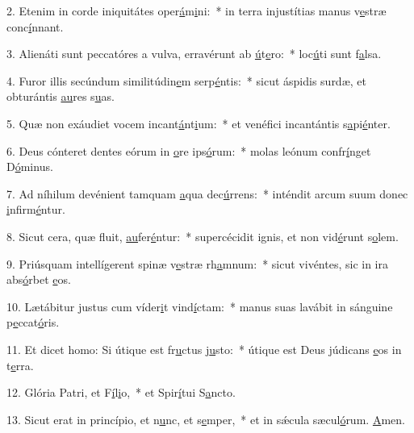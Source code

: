 2. Etenim in corde iniquitátes oper\uline{á}m\uline{i}ni:~* in terra injustítias manus v\uline{e}stræ conc\uline{í}nnant.\par 
3. Alienáti sunt peccatóres a vulva, erravérunt ab \uline{ú}t\uline{e}ro:~* loc\uline{ú}ti sunt f\uline{a}lsa.\par 
4. Furor illis secúndum similitúdin\uline{e}m serp\uline{é}ntis:~* sicut áspidis surdæ, et obturántis \uline{au}res s\uline{u}as.\par 
5. Quæ non exáudiet vocem incant\uline{á}nt\uline{i}um:~* et venéfici incantántis s\uline{a}pi\uline{é}nter.\par 
6. Deus cónteret dentes eórum in \uline{o}re ips\uline{ó}rum:~* molas leónum confr\uline{í}nget D\uline{ó}minus.\par 
7. Ad níhilum devénient tamquam \uline{a}qua dec\uline{ú}rrens:~* inténdit arcum suum donec \uline{i}nfirm\uline{é}ntur.\par 
8. Sicut cera, quæ fluit, \uline{au}fer\uline{é}ntur:~* supercécidit ignis, et non vid\uline{é}runt s\uline{o}lem.\par 
9. Priúsquam intellígerent spinæ v\uline{e}stræ rh\uline{a}mnum:~* sicut vivéntes, sic in ira abs\uline{ó}rbet \uline{e}os.\par 
10. Lætábitur justus cum víder\uline{i}t vind\uline{í}ctam:~* manus suas lavábit in sánguine p\uline{e}ccat\uline{ó}ris.\par 
11. Et dicet homo: Si útique est fr\uline{u}ctus j\uline{u}sto:~* útique est Deus júdicans \uline{e}os in t\uline{e}rra.\par 
12. Glória Patri, et F\uline{í}l\uline{i}o,~* et Spir\uline{í}tui S\uline{a}ncto.\par 
13. Sicut erat in princípio, et n\uline{u}nc, et s\uline{e}mper,~* et in sǽcula sæcul\uline{ó}rum. \uline{A}men.\par 
